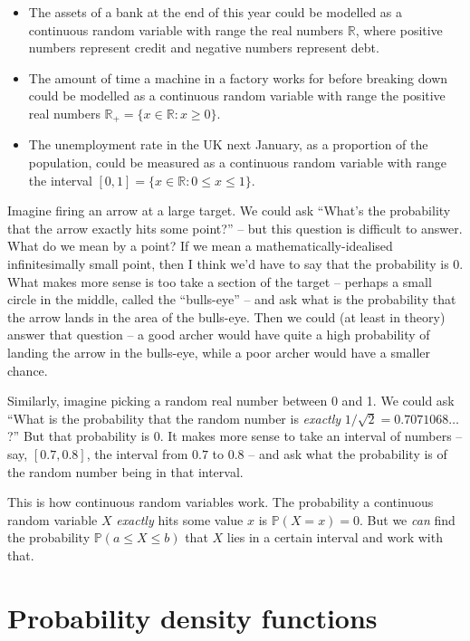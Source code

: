 \documentclass[
  a4paper,
]{book}
\providecommand{\tightlist}{%
  \setlength{\itemsep}{0pt}\setlength{\parskip}{0pt}}
\theoremstyle{definition}
\theoremstyle{definition}
\theoremstyle{definition}
\theoremstyle{definition}
\theoremstyle{remark}
\begin{document}
\begin{itemize}
\tightlist
\item
  The assets of a bank at the end of this year could be modelled as a continuous random variable with range the real numbers \(\mathbb R\), where positive numbers represent credit and negative numbers represent debt.
\item
  The amount of time a machine in a factory works for before breaking down could be modelled as a continuous random variable with range the positive real numbers \(\mathbb R_+ = \{x \in \mathbb R : x \geq 0\}\).
\item
  The unemployment rate in the UK next January, as a proportion of the population, could be measured as a continuous random variable with range the interval \([0, 1] = \{x \in \mathbb R : 0 \leq x \leq 1\}\).
\end{itemize}

Imagine firing an arrow at a large target. We could ask ``What's the probability that the arrow exactly hits some point?'' -- but this question is difficult to answer. What do we mean by a point? If we mean a mathematically-idealised infinitesimally small point, then I think we'd have to say that the probability is 0. What makes more sense is too take a section of the target -- perhaps a small circle in the middle, called the ``bulls-eye'' -- and ask what is the probability that the arrow lands in the area of the bulls-eye. Then we could (at least in theory) answer that question -- a good archer would have quite a high probability of landing the arrow in the bulls-eye, while a poor archer would have a smaller chance.

Similarly, imagine picking a random real number between 0 and 1. We could ask ``What is the probability that the random number is \emph{exactly} \(1/\sqrt{2} = 0.7071068\dots\)?'' But that probability is 0. It makes more sense to take an interval of numbers -- say, \([0.7, 0.8]\), the interval from \(0.7\) to \(0.8\) -- and ask what the probability is of the random number being in that interval.

This is how continuous random variables work. The probability a continuous random variable \(X\) \emph{exactly} hits some value \(x\) is \(\mathbb P(X = x) = 0\). But we \emph{can} find the probability \(\mathbb P(a \leq X \leq b)\) that \(X\) lies in a certain interval and work with that.

\hypertarget{pdf}{%
\section{Probability density functions}\label{pdf}}
\end{document}
